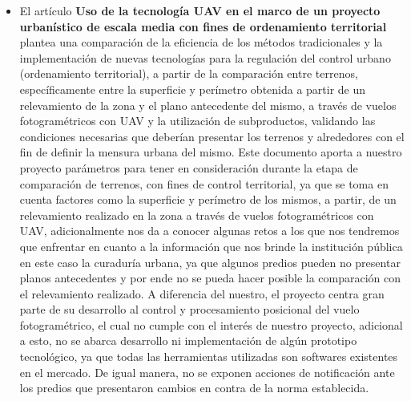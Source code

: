 \begin{itemize}
        \item El artículo \textbf{Uso de la tecnología UAV en el marco de un proyecto urbanístico de escala media con fines de ordenamiento territorial} \cite{garcilar_lallana_uso_2019} plantea una comparación de la eficiencia de los métodos tradicionales y la implementación de nuevas tecnologías para la regulación del control urbano (ordenamiento territorial), a partir de la comparación entre terrenos, específicamente entre la superficie y perímetro obtenida a partir de un relevamiento de la zona y  el plano antecedente del mismo, a través de vuelos fotogramétricos con UAV y la utilización de subproductos, validando las condiciones necesarias que deberían presentar los terrenos y alrededores con el fin de definir la  mensura urbana del mismo.
        Este documento aporta a nuestro proyecto parámetros para tener en consideración durante la etapa de comparación de terrenos, con fines de control territorial,  ya que se toma en cuenta factores como la superficie y perímetro de los mismos, a partir, de un relevamiento realizado en la zona a través de vuelos fotogramétricos con UAV, adicionalmente nos da a conocer algunas retos a los que nos tendremos que enfrentar en cuanto a la información que nos brinde la institución pública en este caso la curaduría urbana, ya que algunos predios pueden no presentar planos antecedentes y por ende no se pueda hacer posible la comparación con el relevamiento realizado.
        A diferencia del nuestro, el proyecto centra gran parte de su desarrollo al control y procesamiento posicional del vuelo fotogramétrico, el cual no cumple con el interés de nuestro proyecto, adicional a esto, no se abarca desarrollo ni implementación de algún prototipo tecnológico, ya que todas las herramientas utilizadas son softwares existentes en el mercado. De igual manera, no se exponen acciones de notificación ante los predios que presentaron cambios en contra de la norma establecida.
        

\end{itemize}
